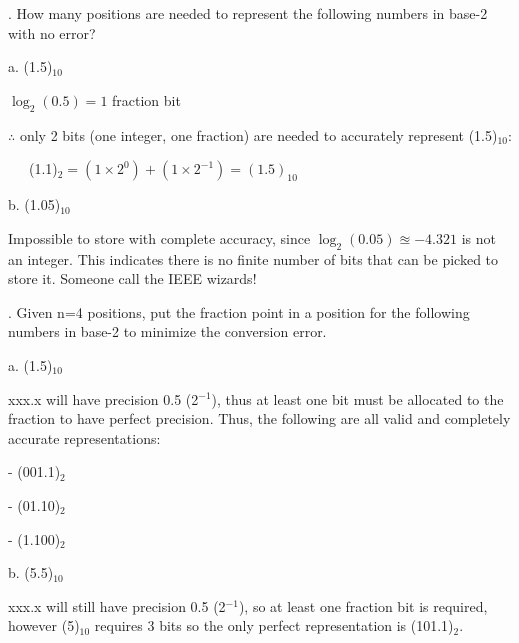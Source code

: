 \documentclass[12pt]{book}
\newenvironment{indented}[1] {
	\begin{list}{}{\setlength{\leftmargin}{#1}}
		\item[]
}{\end{list}}
\begin{document}
	. How many positions are needed to represent the following numbers in base-2 with no error?
	
	\begin{indented}{5mm}
		a. (1.5)$_{10}$
		\begin{indented}{5mm}
			$\log_2(0.5) = 1$ fraction bit

			\medskip
			$\therefore$ only 2 bits (one integer, one fraction) are needed to accurately 
			represent (1.5)$_{10}$: 
			
			\ \ \ (1.1)$_2 = (1 \times 2^0) + (1 \times 2^{-1}) = (1.5)_{10}$
		\end{indented}
	\end{indented}

	\begin{indented}{5mm}
		b. (1.05)$_{10}$
		\begin{indented}{5mm}
			Impossible to store with complete accuracy, since $\log_2(0.05) \approxeq -4.321$ 
			is not an integer. This indicates there is no finite number of bits that can be picked
			to store it. Someone call the IEEE wizards!
		\end{indented}
	\end{indented}

	. Given n=4 positions, put the fraction point in a position for the following numbers in 
	base-2 to minimize the conversion error.

	\begin{indented}{5mm}
		a. (1.5)$_{10}$
		\begin{indented}{5mm}
			xxx.x will have precision 0.5 (2$^{-1}$), thus at least one bit must be allocated
			to the fraction to have perfect precision. Thus, the following are all valid
			and completely accurate representations:
			
		\begin{list}{}{}
			\item- (001.1)$_2$
			\item- (01.10)$_2$
			\item- (1.100)$_2$
		\end{list}

		\end{indented}
	\end{indented}

	\begin{indented}{5mm}
		b. (5.5)$_{10}$
		\begin{indented}{5mm}
			xxx.x will still have precision 0.5 (2$^{-1}$), so at least one fraction bit
			is required, however (5)$_{10}$ requires 3 bits so the only perfect representation
			is (101.1)$_2$.
		\end{indented}
	\end{indented}
\end{document}
